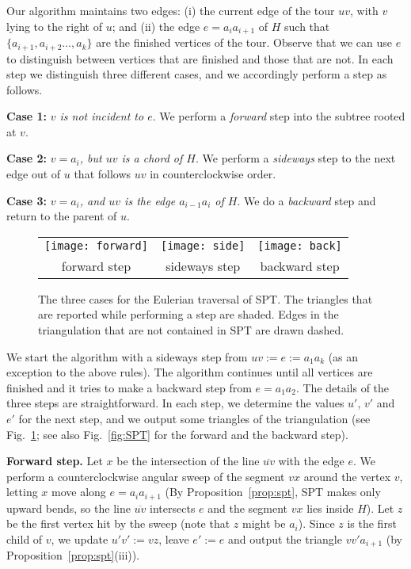 \documentclass[11pt,a4paper]{article}
\newcommand{\eqdef}{:=}
\begin{document}
Our algorithm maintains two edges: (i) the current edge of the tour $uv$,
with $v$ lying to the right of $u$; and
(ii) the edge $e=a_ia_{i+1}$ of $H$ such that
$\{a_{i+1},a_{i+2}\ldots,a_k\}$ are the finished vertices of the tour.
Observe that we can use
 $e$ to distinguish between vertices that
are finished and those that are not.
In each step we distinguish three different cases,
and we accordingly perform a step as follows.

\textbf{Case 1:}
 \emph{$v$ is not incident to $e$}.
We perform a \emph{forward} step
into the subtree rooted at $v$.

\textbf{Case 2:} \emph{$v=a_{i}$,
but $uv$ is a chord of $H$}.
We perform a \emph{sideways} step to the
next edge out of $u$
that follows $uv$ in counterclockwise order.

\textbf{Case 3:} \emph{$v=a_{i}$, and $uv$ is the edge $a_{i-1}a_i$ of $H$}. We do a \emph{backward} step and
return to the parent of $u$.


\begin{figure}
\begin{center}
\begin{tabular}{ccc}
\texttt{[image: forward]} &
\texttt{[image: side]} &
\texttt{[image: back]}
\\
forward step & sideways step & backward step
\end{tabular}
\end{center}
\caption{The three cases for the Eulerian traversal of SPT. The triangles that are reported while performing a step are shaded. Edges in the triangulation that are not contained in SPT are drawn dashed.}
\label{fig:unimonotone-traversal}
\end{figure}


\noindent
We start the algorithm with
 a sideways step from
$uv  \eqdef e \eqdef a_1a_k$ (as an exception to the above rules).
The algorithm continues until all vertices are finished and it
tries to make a backward step from $e=a_1a_2$.
The details of the three steps are straightforward.
In each step, we determine the
values $u'$, $v'$ and $e'$ for the next step, and we output some triangles
of the triangulation (see Fig.~\ref{fig:unimonotone-traversal}; see also
Fig.~\ref{fig:SPT} for the forward and the backward step).

\textbf{Forward step.}
Let $x$ be the intersection of the line $\overline{uv}$ with the
edge $e$. We perform a counterclockwise angular sweep of the segment
$vx$ around the vertex $v$, letting $x$ move along
$e=a_ia_{i+1}$ (By Proposition~\ref{prop:spt}, SPT makes only
upward bends, so the line $\overline{uv}$ intersects $e$ and
the segment $vx$ lies inside $H$).
Let $z$ be the first vertex hit by the sweep
(note that $z$ might be $a_i$).
Since $z$ is the first child of $v$,
we update $u'v' \eqdef vz$, leave $e' \eqdef e$ and
output the triangle $vv'a_{i+1}$ (by Proposition~\ref{prop:spt}(iii)).
\end{document}
